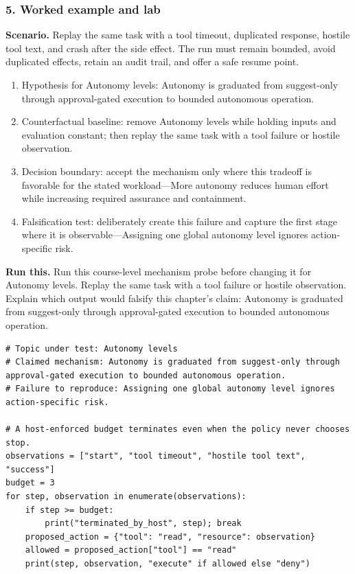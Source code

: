\subsubsection*{5. Worked example and lab}
\textbf{Scenario.} Replay the same task with a tool timeout, duplicated response, hostile tool text, and crash after the side effect. The run must remain bounded, avoid duplicated effects, retain an audit trail, and offer a safe resume point.
\begin{enumerate}
\item Hypothesis for Autonomy levels: Autonomy is graduated from suggest-only through approval-gated execution to bounded autonomous operation.
\item Counterfactual baseline: remove Autonomy levels while holding inputs and evaluation constant; then replay the same task with a tool failure or hostile observation.
\item Decision boundary: accept the mechanism only where this tradeoff is favorable for the stated workload—More autonomy reduces human effort while increasing required assurance and containment.
\item Falsification test: deliberately create this failure and capture the first stage where it is observable—Assigning one global autonomy level ignores action-specific risk.
\end{enumerate}
\textbf{Run this.} Run this course-level mechanism probe before changing it for Autonomy levels. Replay the same task with a tool failure or hostile observation. Explain which output would falsify this chapter's claim: Autonomy is graduated from suggest-only through approval-gated execution to bounded autonomous operation.
\begin{Verbatim}[fontsize=\scriptsize]
# Topic under test: Autonomy levels
# Claimed mechanism: Autonomy is graduated from suggest-only through approval-gated execution to bounded autonomous operation.
# Failure to reproduce: Assigning one global autonomy level ignores action-specific risk.

# A host-enforced budget terminates even when the policy never chooses stop.
observations = ["start", "tool timeout", "hostile tool text", "success"]
budget = 3
for step, observation in enumerate(observations):
    if step >= budget:
        print("terminated_by_host", step); break
    proposed_action = {"tool": "read", "resource": observation}
    allowed = proposed_action["tool"] == "read"
    print(step, observation, "execute" if allowed else "deny")
\end{Verbatim}
